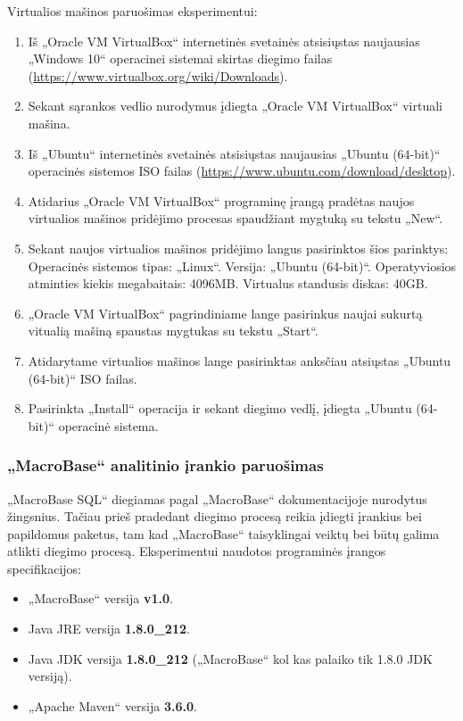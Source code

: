 \documentclass{VUMIFPSbakalaurinis}
\begin{document}
Virtualios mašinos paruošimas eksperimentui:
\begin{enumerate}
	\item Iš „Oracle VM VirtualBox“ internetinės svetainės atsisiųstas naujausias „Windows 10“ operacinei sistemai skirtas diegimo failas (\url{https://www.virtualbox.org/wiki/Downloads}).
	\item Sekant sąrankos vedlio nurodymus įdiegta „Oracle VM VirtualBox“ virtuali mašina.
	\item Iš „Ubuntu“ internetinės svetainės atsisiųstas naujausias „Ubuntu (64-bit)“ operacinės sistemos ISO failas (\url{https://www.ubuntu.com/download/desktop}).
	\item Atidarius „Oracle VM VirtualBox“ programinę įrangą pradėtas naujos virtualios mašinos pridėjimo procesas spaudžiant mygtuką su tekstu „New“.
	\item Sekant naujos virtualios mašinos pridėjimo langus pasirinktos šios parinktys:
		\subitem Operacinės sistemos tipas: „Linux“.
		\subitem Versija: „Ubuntu (64-bit)“.
		\subitem Operatyviosios atminties kiekis megabaitais: 4096MB.
		\subitem Virtualus standusis diskas: 40GB.
	\item „Oracle VM VirtualBox“ pagrindiniame lange pasirinkus naujai sukurtą vitualią mašiną spaustas mygtukas su tekstu „Start“.
	\item Atidarytame virtualios mašinos lange pasirinktas anksčiau atsiųstas „Ubuntu (64-bit)“ ISO failas.
	\item Pasirinkta „Install“ operacija ir sekant diegimo vedlį, įdiegta „Ubuntu (64-bit)“ operacinė sistema.	
\end{enumerate}

\subsubsection{„MacroBase“ analitinio įrankio paruošimas}
„MacroBase SQL“ diegiamas pagal „MacroBase“ dokumentacijoje nurodytus žingsnius. Tačiau prieš pradedant diegimo procesą reikia įdiegti įrankius bei papildomus paketus, tam kad „MacroBase“ taisyklingai veiktų bei būtų galima atlikti diegimo procesą. Eksperimentui naudotos programinės įrangos specifikacijos:
\begin{itemize}
	\item „MacroBase“ versija \textbf{v1.0}.
	\item Java JRE versija \textbf{1.8.0\_212}.
	\item Java JDK versija \textbf{1.8.0\_212} („MacroBase“ kol kas palaiko tik 1.8.0 JDK versiją).
	\item „Apache Maven“ versija \textbf{3.6.0}.
\end{itemize}
\end{document}
